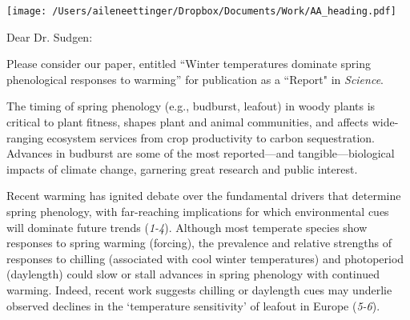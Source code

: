 \documentclass[10.5pt,a4paper]{letter}
\begin{document}

\begin{letter}{}
\texttt{[image: /Users/aileneettinger/Dropbox/Documents/Work/AA\_heading.pdf]}

\opening{Dear Dr. Sudgen:}
Please consider our paper, entitled ``Winter temperatures dominate spring phenological responses to warming'' for publication as a ``Report" in \emph{Science}. 

The timing of spring phenology (e.g., budburst, leafout) in woody plants is critical to plant fitness, shapes plant and animal communities, and affects wide-ranging ecosystem services from crop productivity to carbon sequestration. 
Advances in budburst are some of the most reported---and tangible---biological impacts of climate change, garnering great research and public interest. 

\par Recent warming has ignited debate over the fundamental drivers that determine spring phenology, with far-reaching implications for which environmental cues will dominate future trends  (\emph{1-4}).
Although most temperate species show responses to spring warming (forcing), the prevalence and relative strengths of responses to chilling (associated with cool winter temperatures) and photoperiod (daylength) could slow or stall advances in spring phenology with continued warming. Indeed, recent work suggests chilling or daylength cues may underlie observed declines in the `temperature sensitivity' of leafout in Europe (\emph{5-6}). 


\end{letter}
\end{document}
